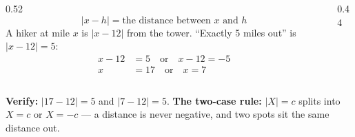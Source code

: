 \documentclass[aspectratio=169, 11pt]{beamer}
\newcommand{\trail}{%
  \draw[->, thick, charcoal] (-0.7,0)--(21.2,0) node[right, font=\tiny]{mile};
  \foreach \x in {0,...,20}{\draw[charcoal] (\x,0.22)--(\x,-0.22);}
  \foreach \x in {0,4,...,20}{\node[below, font=\tiny, charcoal] at (\x,-0.26){$\x$};}
  \fill[forest] (12,0) circle (3pt);
  \node[forest, font=\tiny, above] at (12,0.30){tower};}
\begin{document}
\begin{frame}[t, plain]
  \begin{columns}[T]
    \begin{column}{0.52\textwidth}
      \[ |x-h| = \text{the distance between } x \text{ and } h \]
      A hiker at mile $x$ is $|x-12|$ from the tower. ``Exactly 5 miles out'' is $|x-12|=5$:
      \begin{align*}
        x-12 &= 5 \quad\text{or}\quad x-12 = -5 \\
           x &= 17 \quad\text{or}\quad x = 7
      \end{align*}
    \end{column}
    \begin{column}{0.44\textwidth}
      \centering
    \end{column}
  \end{columns}
  \vspace{4pt}
  \textbf{Verify:} $|17-12|=5$ and $|7-12|=5$. \; \textbf{The two-case rule:} $|X|=c$ splits into
  $X=c$ or $X=-c$ --- a distance is never negative, and two spots sit the same distance out.
\end{frame}
\end{document}
